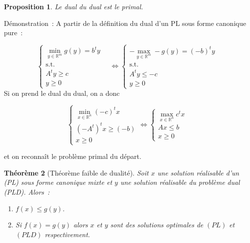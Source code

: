 \documentclass[a4paper,12pt,openany]{book}
\theoremstyle{plain}
\newtheorem{theorem}{Théorème}[section]
\newtheorem{proposition}[theorem]{Proposition}
\theoremstyle{definition}
\theoremstyle{remark}
\theoremstyle{nbstyle}
\begin{document}
	\begin{proposition}
		Le dual du dual est le primal.
	\end{proposition}
	
	Démonstration~: A partir de la définition du dual d'un PL sous forme canonique pure~:
	
	\[
	\left\{
	\begin{array}{l}
	\displaystyle\min_{y \in \mathbb{R}^{m}} g(y)=b^{t} y \\
	\text{s.t.}\\
	A^{t} y \geq c \\
	y \geq 0
	\end{array}
	\quad
	\right.
	\Longleftrightarrow
	\left\{
	\begin{array}{l}
	-\displaystyle\max_{y \in \mathbb{R}^{m}}-g(y)=(-b)^{t} y \\
	\text{s.t.}\\
	A^{t} y \leq -c \\
	y \geq 0
	\end{array}
	\right.
	\]
	Si on prend le dual du dual, on a donc
	
	\[
	\left\{
	\begin{array}{l}
	\displaystyle\min_{x \in \mathbb{R}^{n}} (-c)^{t} x \\
	(-A^{t})^{t} x \geq (-b) \\
	x \geq 0
	\end{array}
	\right.
	\Longleftrightarrow
	\left\{
	\begin{array}{l}
	\displaystyle\max_{x \in \mathbb{R}^{n}} c^{t} x \\
	A x \leq b \\
	x \geq 0
	\end{array}
	\right.
	\]
	
	et on reconnaît le problème primal du départ.
	
	\begin{theorem}[Théorème faible de dualité]
		Soit $x$ une solution réalisable d'un (PL) sous forme canonique mixte et $y$ une solution réalisable du problème dual (PLD). Alors~:
		
		\begin{enumerate}
			\item $f(x) \leq g(y)$.
			\item Si $f(x)=g(y)$ alors $x$ et $y$ sont des solutions optimales de $(PL)$ et $(PLD)$ respectivement.
		\end{enumerate}
	\end{theorem}
	
\end{document}
